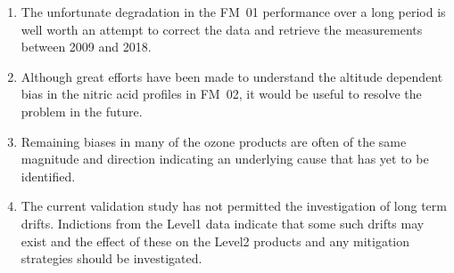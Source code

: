 \begin{enumerate}
\item The unfortunate degradation in the FM~01 performance over a long period is well worth an attempt to correct the data and retrieve the  measurements between 2009 and 2018.  
\item Although great efforts have been made to understand the altitude dependent bias in the nitric acid profiles in FM~02, it would be useful to resolve the problem in the future.
\item Remaining biases in many of the ozone products are often of the same magnitude and direction indicating an underlying  cause that has yet to be identified.
\item The current validation study has not permitted the investigation of long term drifts.  Indictions from the Level1 data indicate that some such drifts may exist and the effect of these on the Level2 products and any mitigation strategies should be investigated.
\end{enumerate}
 
